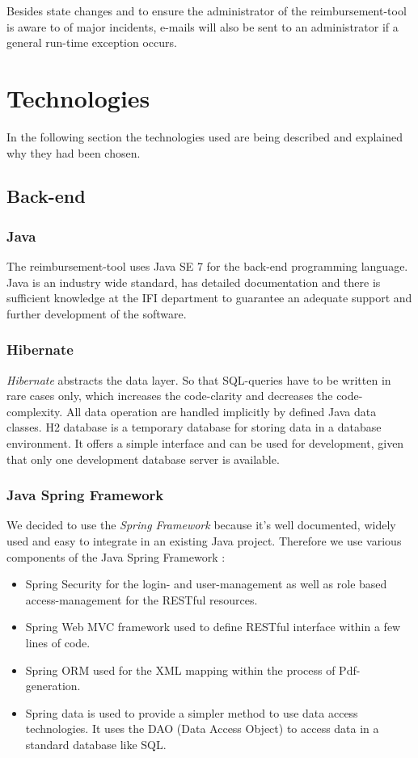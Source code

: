 Besides state changes and to ensure the administrator of the reimbursement-tool is aware to of major incidents, e-mails will also be sent to an administrator if a general run-time exception occurs. 

\section{Technologies}

In the following section the technologies used are being described and explained why they had been chosen.

\subsection{Back-end}

\subsubsection{Java}
The reimbursement-tool uses Java SE 7 for the back-end programming language. Java is an industry wide standard, has detailed documentation and there is sufficient knowledge at the IFI department to guarantee an adequate support and further development of the software.

\subsubsection{Hibernate}
\textit{Hibernate} abstracts the data layer. So that SQL-queries have to be written in rare cases only, which increases the code-clarity and decreases the code-complexity. All data operation are handled implicitly by defined Java data classes.\newline
H2 database is a temporary database for storing data in a database environment. It offers a simple interface and can be used for development, given that only one development database server is available. \cite{hibernate}

\subsubsection{Java Spring Framework}
We decided to use the \textit{Spring Framework} because it's well documented, widely used and easy to integrate in an existing Java project. Therefore we use various components of the Java Spring Framework \cite{spring}:
\begin{itemize}
	\item Spring Security for the login- and user-management as well as role based access-management for the RESTful resources.
	\item Spring Web MVC framework used to define RESTful interface within a few lines of code.
	\item Spring ORM used for the XML mapping within the process of Pdf-generation.
	\item Spring data is used to provide a simpler method to use data access technologies. It uses the DAO (Data Access Object) \cite{dao} to access data in a standard database like SQL.
\end{itemize}

